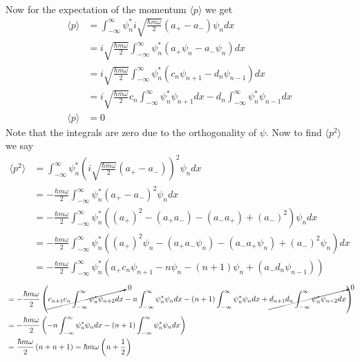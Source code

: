 \documentclass[11pt]{article}
\numberwithin{equation}{section}
\newcommand{\expt}[1]{\langle{#1}\rangle}
\begin{document}
\begin{enumerate}[(a)]
\begin{align*}
\end{align*}
Now for the expectation of the momentum $\expt{p}$ we get
\begin{align*}
\expt{p} &= \int_{-\infty}^{\infty}\psi_n^*i\sqrt{\frac{\hbar m\omega}{2}}(a_+-a_-)\psi_ndx\\
&= i\sqrt{\frac{\hbar m\omega}{2}}\int_{-\infty}^{\infty}\psi_n^*(a_+\psi_n-a_-\psi_n)dx\\
&= i\sqrt{\frac{\hbar m\omega}{2}}\int_{-\infty}^{\infty}\psi_n^*(c_n\psi_{n+1}-d_n\psi_{n-1})dx\\
&= i\sqrt{\frac{\hbar m\omega}{2}}c_n\int_{-\infty}^{\infty}\psi_n^*\psi_{n+1}dx-d_n\int_{-\infty}^{\infty}\psi^*_n\psi_{n-1}dx\\
\expt{p} &= 0
\end{align*}
Note that the integrals are zero due to the orthogonality of $\psi$. Now to find $\expt{p^2}$ we say
\begin{align*}
\expt{p^2} &= \int_{-\infty}^{\infty}\psi_n^*\left(i\sqrt{\frac{\hbar m\omega}{2}}(a_+-a_-)\right)^2\psi_ndx\\
&= -\frac{\hbar m\omega}{2}\int_{-\infty}^{\infty}\psi_n^*\left(a_+-a_-\right)^2\psi_ndx\\
&= -\frac{\hbar m\omega}{2}\int_{-\infty}^{\infty}\psi_n^*((a_+)^2-(a_+a_-)-(a_-a_+)+(a_-)^2)\psi_ndx\\
&= -\frac{\hbar m\omega}{2}\int_{-\infty}^{\infty}\psi_n^*((a_+)^2\psi_n-(a_+a_-\psi_n)-(a_-a_+\psi_n)+(a_-)^2\psi_n)dx\\
&= -\frac{\hbar m\omega}{2}\int_{-\infty}^{\infty}\psi_n^*(a_+c_n\psi_{n+1}-n\psi_n-(n+1)\psi_n+(a_-d_n\psi_{n-1}))
\end{align*}
\begin{align*}
&= -\frac{\hbar m\omega}{2}\left(\cancelto{0}{c_{n+1}c_n\int_{-\infty}^{\infty}\psi_n^*\psi_{n+2}dx}-n\int_{-\infty}^{\infty}\psi_n^*\psi_ndx-(n+1)\int_{-\infty}^{\infty}\psi_n^*\psi_ndx+\cancelto{0}{d_{n+1}d_n\int_{-\infty}^{\infty}\psi_n^*\psi_{n-2}dx}\right)\\
&= -\frac{\hbar m\omega}{2}\left(-n\int_{-\infty}^{\infty}\psi_n^*\psi_ndx-(n+1)\int_{-\infty}^{\infty}\psi_n^*\psi_ndx\right)\\
&= \frac{\hbar m\omega}{2}\left(n+n+1\right) = \hbar m\omega\left(n+\frac{1}{2}\right) 
\end{align*}


\end{enumerate}
\end{document}
